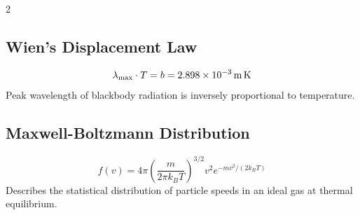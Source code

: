 \documentclass[10pt,a4paper]{article}
\begin{document}
\begin{multicols}{2}
\subsection{Wien's Displacement Law}
\[
\lambda_\text{max} \cdot T = b = 2.898\times10^{-3}\,\text{m\,K}
\]
Peak wavelength of blackbody radiation is inversely proportional to temperature.

\subsection{Maxwell-Boltzmann Distribution}
\[
f(v) = 4\pi\left(\frac{m}{2\pi k_BT}\right)^{3/2}v^2 e^{-mv^2/(2k_BT)}
\]
Describes the statistical distribution of particle speeds in an ideal gas at thermal equilibrium.

\end{multicols}
\end{document}
